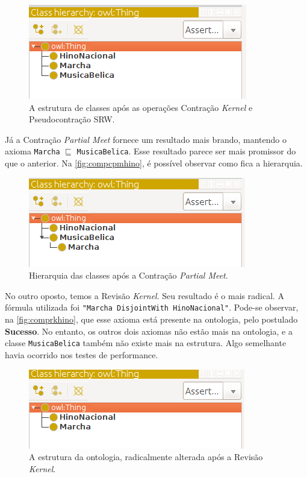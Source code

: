 \begin{figure}[H]
	\centering
	\includegraphics[width=0.5\linewidth]{Capitulos/Testes/compckhino}
	\caption{A estrutura de classes após as operações Contração \textit{Kernel} e Pseudocontração SRW.}
	\label{fig:compckhino}
\end{figure}

Já a Contração \textit{Partial Meet} fornece um resultado mais brando, mantendo o axioma \texttt{Marcha} $ \sqsubseteq $ \texttt{MusicaBelica}. Esse resultado parece ser mais promissor do que o anterior. Na \autoref{fig:compcpmhino}, é possível observar como fica a hierarquia.

\begin{figure}[H]
	\centering
	\includegraphics[width=0.5\linewidth]{Capitulos/Testes/compcpmhino}
	\caption{Hierarquia das classes após a Contração \textit{Partial Meet}.}
	\label{fig:compcpmhino}
\end{figure}

No outro oposto, temos a Revisão \textit{Kernel}. Seu resultado é o mais radical. A fórmula utilizada foi \texttt{"Marcha DisjointWith HinoNacional"}. Pode-se observar, na \autoref{fig:comprkhino}, que esse axioma está presente na ontologia, pelo postulado \textbf{Sucesso}. No entanto, os outros dois axiomas não estão mais na ontologia, e a classe \texttt{MusicaBelica} também não existe mais na estrutura. Algo semelhante havia ocorrido nos testes de performance.

\begin{figure}[H]
	\centering
	\includegraphics[width=0.5\linewidth]{Capitulos/Testes/comprkhino}
	\caption{A estrutura da ontologia, radicalmente alterada após a Revisão \textit{Kernel}.}
	\label{fig:comprkhino}
\end{figure}